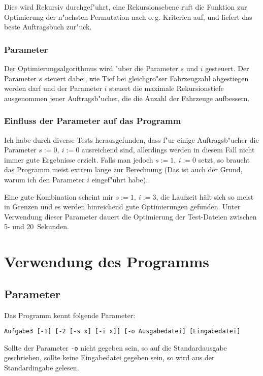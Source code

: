 \documentclass{scrreprt}
\begin{document}
Dies wird Rekursiv durchgef"uhrt, eine Rekursionsebene ruft die Funktion zur
Optimierung der n"achsten Permutation nach o.\,g. Kriterien auf, und liefert das
beste Auftragsbuch zur"uck.

\subsection{Parameter}
Der Optimierungsalgorithmus wird "uber die Parameter $s$ und $i$ gesteuert. Der
Parameter $s$ steuert dabei, wie Tief bei gleichgro"ser Fahrzeugzahl abgestiegen
werden darf und der Parameter $i$ steuert die maximale Rekursionstiefe
ausgenommen jener Auftragsb"ucher, die die Anzahl der Fahrzeuge aufbessern.

\subsection{Einfluss der Parameter auf das Programm}
Ich habe durch diverse Tests herausgefunden, dass f"ur einige Auftragsb"ucher
die Parameter $s := 0,\ i := 0$ ausreichend sind, allerdings werden in diesem
Fall nicht immer gute Ergebnisse erzielt.  Falls man jedoch $s := 1,\ i := 0$
setzt, so braucht das Programm meist extrem lange zur Berechnung (Das ist auch
der Grund, warum ich den Parameter $i$ eingef"uhrt habe).

Eine gute Kombination scheint mir $s := 1,\ i := 3$, die Laufzeit hält sich so
meist in Grenzen und es werden hinreichend gute Optimierungen gefunden.  Unter
Verwendung dieser Parameter dauert die Optimierung der Test-Dateien zwischen 5-
und 20\ Sekunden.

\chapter{Verwendung des Programms}

\section{Parameter}
Das Programm kennt folgende Parameter:

\begin{verbatim}
Aufgabe3 [-1] [-2 [-s x] [-i x]] [-o Ausgabedatei] [Eingabedatei]
\end{verbatim}

Sollte der Parameter \texttt{-o} nicht gegeben sein, so auf die Standardausgabe
geschrieben, sollte keine Eingabedatei gegeben sein, so wird aus der
Standardingabe gelesen.
\end{document}
